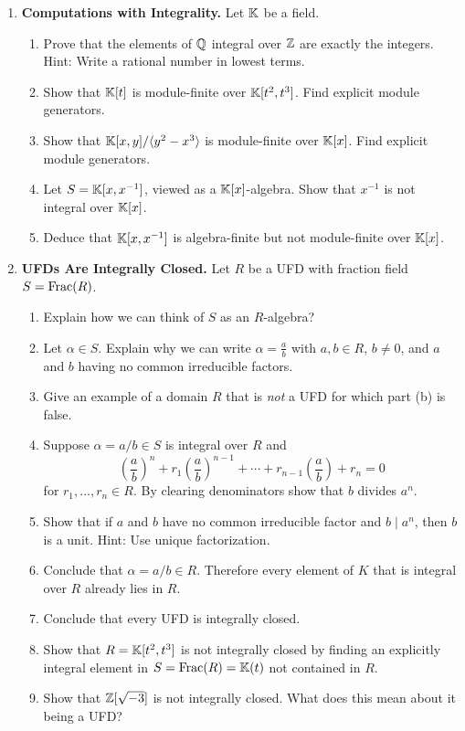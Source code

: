 \documentclass[12pt,reqno]{amsart}
\begin{document}
\begin{enumerate}[leftmargin=*, resume=problems]
\item \textbf{Computations with Integrality.} Let $\mathbb{K}$ be a field.
\begin{enumerate}
    \item Prove that the elements of $\mathbb{Q}$ integral over $\mathbb{Z}$ are exactly the integers. Hint: Write a rational number in lowest terms.
    \item Show that $\mathbb{K}[t]$ is module-finite over $\mathbb{K}[t^2,t^3]$. Find explicit module generators.
    \item Show that $\mathbb{K}[x,y]/\langle y^2-x^3\rangle$ is module-finite over $\mathbb{K}[x]$. Find explicit module generators.
    \item Let $S=\mathbb{K}[x,x^{-1}]$, viewed as a $\mathbb{K}[x]$-algebra. Show that $x^{-1}$ is not integral over $\mathbb{K}[x]$.
    \item Deduce that $\mathbb{K}[x,x^{-1}]$ is algebra-finite but not module-finite over $\mathbb{K}[x]$.
\end{enumerate}

\item \textbf{UFDs Are Integrally Closed.} Let $R$ be a UFD with fraction field $S=\operatorname{Frac}(R)$.
\begin{enumerate}
    \item Explain how we can think of $S$ as an $R$-algebra? 
    \item Let $\alpha\in S$. Explain why we can write $\alpha=\frac{a}{b}$ with $a,b\in R$, $b\neq 0$, and $a$ and $b$ having no common irreducible factors. 
    \item Give an example of a domain $R$ that is \emph{not} a UFD for which part (b) is false. 

    \item Suppose $\alpha=a/b \in S$ is integral over $R$ and
    \[
    \left(\frac{a}{b}\right)^n
    +r_1\left(\frac{a}{b}\right)^{n-1}
    +\cdots
    +r_{n-1}\left(\frac{a}{b}\right)
    +r_n
    =0
    \]
     for $r_1,\ldots,r_n\in R$. By clearing denominators show that $b$ divides $a^{n}$. 

    \item Show that if $a$ and $b$ have no common irreducible factor and $b\mid a^n$, then $b$ is a unit. Hint: Use unique factorization.

    \item Conclude that $\alpha=a/b\in R$. Therefore every element of $K$ that is integral over $R$ already lies in $R$.

    \item Conclude that every UFD is integrally closed.
    
    \item Show that $R=\mathbb{K}[t^2,t^3]$ is not integrally closed by finding an explicitly integral element in $S=\operatorname{Frac}(R)=\mathbb{K}(t)$ not contained in $R$. 
    
    \item Show that $\mathbb{Z}[\sqrt{-3}]$ is not integrally closed. What does this mean about it being a UFD?
\end{enumerate}

\end{enumerate}
\end{document}
